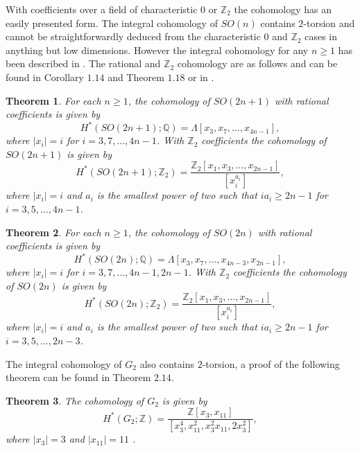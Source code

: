 \documentclass{article}
\theoremstyle{plain}
\newtheorem{thm}{Theorem}[section]
\theoremstyle{definition}
\numberwithin{thm}{section}
\begin{document}
		With coefficients over a field of characteristic $0$ or $\mathbb{Z}_2$
		the cohomology has an easily presented form.
		The integral cohomology of $SO(n)$ contains $2$-torsion
		and cannot be straightforwardly deduced from the characteristic $0$ and $\mathbb{Z}_2$ cases in anything but low dimensions.
		However the integral cohomology for any $n\geq 1$ has been described in \cite{PITTIE}. 
		The rational and $\mathbb{Z}_2$ cohomology are as follows and can be found in \cite[\S 3.6,7.5]{TLI&II} Corollary $1.14$ and Theorem $1.18$
		or in \cite{CohomologyLieGroup}.
		
		\begin{thm}\label{thm:H*(SO(2n+1);QZ2)}
			For each $n\geq 1$, the cohomology of $SO(2n+1)$ with rational coefficients is given by
			\begin{equation*}
				H^*(SO(2n+1);\mathbb{Q})=\Lambda[x_3,x_7,\dots,x_{4n-1}],
			\end{equation*}
			where $|x_i|=i$ for $i=3,7,\dots,4n-1$.
			With $\mathbb{Z}_2$ coefficients the cohomology of $SO(2n+1)$ is given by
			\begin{equation*}
				H^*(SO(2n+1);\mathbb{Z}_2)=\frac{\mathbb{Z}_2[x_1,x_3,\dots,x_{2n-1}]}{[x_i^{a_i}]},
			\end{equation*}
			where $|x_i|=i$ and $a_i$ is the smallest power of two such that $ia_i\geq 2n-1$ for $i=3,5,\dots,4n-1$.
		\end{thm}
		
		\begin{thm}\label{thm:H*(SO(2n);QZ2)}
			For each $n\geq 1$, the cohomology of $SO(2n)$ with rational coefficients is given by
			\begin{equation*}
				H^*(SO(2n);\mathbb{Q})=\Lambda[x_3,x_7,\dots,x_{4n-3},x_{2n-1}],
			\end{equation*}
			where $|x_i|=i$ for $i=3,7,\dots,4n-1,2n-1$.
			With $\mathbb{Z}_2$ coefficients the cohomology of $SO(2n)$ is given by
			\begin{equation*}
				H^*(SO(2n);\mathbb{Z}_2)=\frac{\mathbb{Z}_2[x_1,x_3,\dots,x_{2n-1}]}{[x_i^{a_i}]},
			\end{equation*}
			where $|x_i|=i$ and $a_i$ is the smallest power of two such that $ia_i\geq 2n-1$ for $i=3,5,\dots,2n-3$.
		\end{thm}
		
		The integral cohomology of $G_2$ also  contains $2$-torsion, a proof of the following theorem can be found in \cite{CohomologyLieGroup} Theorem $2.14$.
		
		\begin{thm}\label{thm:H*(G2)}
			The cohomology of $G_2$ is given by
			\begin{equation*}
				H^*(G_2;\mathbb{Z})=\frac{\mathbb{Z}[x_3,x_{11}]}{[x_3^4,x_{11}^2,x_3^2x_{11},2x_3^2]},
			\end{equation*}
			where $|x_3|=3$ and $|x_{11}|=11$ .
		\end{thm}
\end{document}
